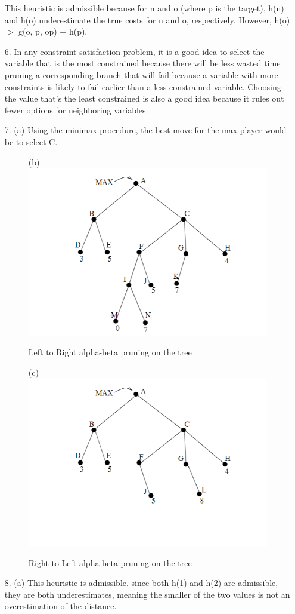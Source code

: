 \documentclass{article}
\begin{document}
\begin{enumerate}
This heuristic is admissible because for n and o (where p is the target), h(n) and h(o) underestimate the true costs for n and o, respectively.  However, h(o) $>$ g(o, p, op) + h(p).

\item[6.] In any constraint satisfaction problem, it is a good idea to select the variable that is the most constrained because there will be less wasted time pruning a corresponding branch that will fail because a variable with more constraints is likely to fail earlier than a less constrained variable.  Choosing the value that's the least constrained is also a good idea because it rules out fewer options for neighboring variables. 

\item[7.] 
(a) Using the minimax procedure, the best move for the max player would be to select C. 

\begin{figure}[h!]
    (b)
    \centering
    \includegraphics[width=.4\linewidth]{AI2 P7 b.png}
    \caption{Left to Right alpha-beta pruning on the tree}
    \label{bidirectional}
\end{figure}

\begin{figure}[h!]
    (c)
    \centering
    \includegraphics[width=.4\linewidth]{AI2 P7 c.png}
    \caption{Right to Left alpha-beta pruning on the tree}
    \label{bidirectional}
\end{figure}

\item[8.] 
(a) This heuristic is admissible. since both h(1) and h(2) are admissible, they are both underestimates, meaning the smaller of the two values is not an overestimation of the distance. 


\end{enumerate}
\end{document}
